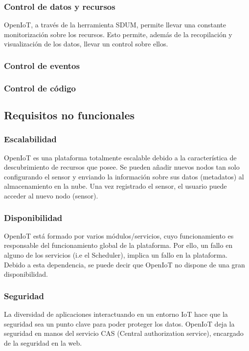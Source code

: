 \documentclass[12pt, twoside]{book}
\begin{document}
\subsubsection*{Control de datos y recursos}
OpenIoT, a través de la herramienta SDUM, permite llevar una constante monitorización sobre los recursos. Esto permite, además de la recopilación y visualización de los datos, llevar un control sobre ellos.

\subsubsection*{Control de eventos}

\subsubsection*{Control de código}


\subsection{Requisitos no funcionales}

\subsubsection*{Escalabilidad}
OpenIoT es una plataforma totalmente escalable debido a la característica de descubrimiento de recursos que posee. Se pueden añadir nuevos nodos tan solo configurando el sensor y enviando la información sobre sus datos (metadatos) al almacenamiento en la nube. Una vez registrado el sensor, el usuario puede acceder al nuevo nodo (sensor).
\subsubsection*{Disponibilidad}
OpenIoT está formado por varios módulos/servicios, cuyo funcionamiento es responsable del funcionamiento global de la plataforma. Por ello, un fallo en alguno de los servicios (i.e el Scheduler), implica un fallo en la plataforma. 
Debido a esta dependencia, se puede decir que OpenIoT no dispone de una gran disponibilidad.
\subsubsection*{Seguridad}
La diversidad de aplicaciones interactuando en un entorno IoT hace que la seguridad sea un punto clave para poder proteger los datos. OpenIoT deja la seguridad en manos del servicio CAS (Central authorization service), encargado de la seguridad en la web.\\
\end{document}
